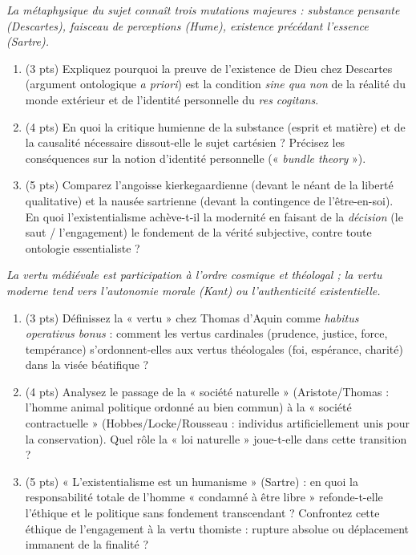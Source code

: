 \documentclass[11pt]{article}
\begin{document}
\begin{exercice}
\emph{La métaphysique du sujet connaît trois mutations majeures : substance pensante (Descartes), faisceau de perceptions (Hume), existence précédant l'essence (Sartre).}
\begin{enumerate}
    \item (3 pts) Expliquez pourquoi la preuve de l'existence de Dieu chez Descartes (argument ontologique \textit{a priori}) est la condition \textit{sine qua non} de la réalité du monde extérieur et de l'identité personnelle du \textit{res cogitans}.
    \item (4 pts) En quoi la critique humienne de la substance (esprit et matière) et de la causalité nécessaire dissout-elle le sujet cartésien ? Précisez les conséquences sur la notion d'identité personnelle (« \textit{bundle theory} »).
    \item (5 pts) Comparez l'angoisse kierkegaardienne (devant le néant de la liberté qualitative) et la nausée sartrienne (devant la contingence de l'être-en-soi). En quoi l'existentialisme achève-t-il la modernité en faisant de la \textit{décision} (le saut / l'engagement) le fondement de la vérité subjective, contre toute ontologie essentialiste ?
\end{enumerate}
\end{exercice}

\begin{exercice}
\emph{La vertu médiévale est participation à l'ordre cosmique et théologal ; la vertu moderne tend vers l'autonomie morale (Kant) ou l'authenticité existentielle.}
\begin{enumerate}
    \item (3 pts) Définissez la « vertu » chez Thomas d'Aquin comme \textit{habitus operativus bonus} : comment les vertus cardinales (prudence, justice, force, tempérance) s'ordonnent-elles aux vertus théologales (foi, espérance, charité) dans la visée béatifique ?
    \item (4 pts) Analysez le passage de la « société naturelle » (Aristote/Thomas : l'homme animal politique ordonné au bien commun) à la « société contractuelle » (Hobbes/Locke/Rousseau : individus artificiellement unis pour la conservation). Quel rôle la « loi naturelle » joue-t-elle dans cette transition ?
    \item (5 pts) « L'existentialisme est un humanisme » (Sartre) : en quoi la responsabilité totale de l'homme « condamné à être libre » refonde-t-elle l'éthique et le politique sans fondement transcendant ? Confrontez cette éthique de l'engagement à la vertu thomiste : rupture absolue ou déplacement immanent de la finalité ?
\end{enumerate}
\end{exercice}
\end{document}
